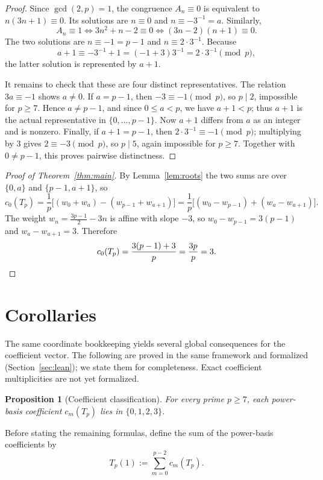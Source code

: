 \documentclass[11pt]{article}
\newtheorem{proposition}[theorem]{Proposition}
\theoremstyle{definition}
\begin{document}
\begin{proof}
Since $\gcd(2,p)=1$, the congruence $A_n\equiv0$ is equivalent to
$n(3n+1)\equiv0$.  Its solutions are $n\equiv0$ and
$n\equiv-3^{-1}=a$.  Similarly,
\[
  A_n\equiv1
  \iff 3n^2+n-2\equiv0
  \iff (3n-2)(n+1)\equiv0.
\]
The two solutions are $n\equiv-1=p-1$ and $n\equiv2\cdot3^{-1}$.
Because
\[
  a+1\equiv -3^{-1}+1
  =(-1+3)3^{-1}
  =2\cdot3^{-1}\pmod p,
\]
the latter solution is represented by $a+1$.

It remains to check that these are four distinct representatives.  The
relation $3a\equiv-1$ shows $a\ne0$.  If $a=p-1$, then
$-3\equiv-1\pmod p$, so $p\mid2$, impossible for $p\ge7$.  Hence
$a\ne p-1$, and since $0\le a<p$, we have $a+1<p$; thus $a+1$ is the
actual representative in $\{0,\ldots,p-1\}$.  Now $a+1$ differs from $a$
as an integer and is nonzero.  Finally, if $a+1=p-1$, then
$2\cdot3^{-1}\equiv-1\pmod p$; multiplying by $3$ gives
$2\equiv-3\pmod p$, so $p\mid5$, again impossible for $p\ge7$.
Together with $0\ne p-1$, this proves pairwise distinctness.
\end{proof}

\begin{proof}[Proof of Theorem~\ref{thm:main}]
By Lemma~\ref{lem:roots} the two sums are over $\{0,a\}$ and $\{p-1,a+1\}$, so
\[
  c_0(T_p)=\frac1p\bigl[(w_0+w_a)-(w_{p-1}+w_{a+1})\bigr]
  =\frac1p\bigl[(w_0-w_{p-1})+(w_a-w_{a+1})\bigr].
\]
The weight $w_n=\tfrac{3p-1}{2}-3n$ is affine with slope $-3$, so $w_0-w_{p-1}=3(p-1)$ and $w_a-w_{a+1}=3$. Therefore
\[
  c_0(T_p)=\frac{3(p-1)+3}{p}=\frac{3p}{p}=3. \qedhere
\]
\end{proof}

\section{Corollaries}\label{sec:cor}

The same coordinate bookkeeping yields several global consequences for the coefficient vector. The following are proved in the same framework and formalized (Section~\ref{sec:lean}); we state them for completeness. Exact coefficient multiplicities are not yet formalized.

\begin{proposition}[Coefficient classification]\label{prop:coeffclass}
For every prime $p\ge 7$, each power-basis coefficient $c_m(T_p)$ lies in $\{0,1,2,3\}$.
\end{proposition}

Before stating the remaining formulas, define the sum of the power-basis
coefficients by
\[
  T_p(1):=\sum_{m=0}^{p-2}c_m(T_p).
\]
\end{document}
